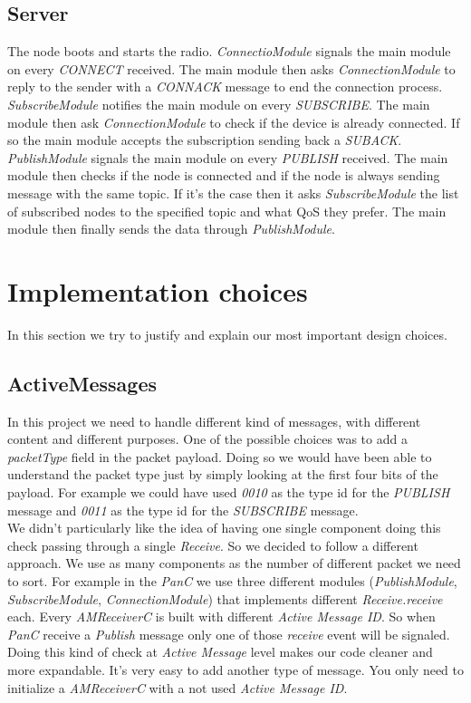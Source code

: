 \documentclass[10pt]{article}
\begin{document}
\subsection{Server}
The node boots and starts the radio. \emph{ConnectioModule} signals the main module on every \emph{CONNECT} received. The main module then asks \emph{ConnectionModule} to reply to the sender with a \emph{CONNACK} message to end the connection process. \emph{SubscribeModule} notifies the main module on every \emph{SUBSCRIBE}. The main module then ask \emph{ConnectionModule} to check if the device is already connected. If so the main module accepts the subscription sending back a \emph{SUBACK}. \emph{PublishModule} signals the main module on every \emph{PUBLISH} received. The main module then checks if the node is connected and if the node is always sending message with the same topic. If it's the case then it asks \emph{SubscribeModule} the list of subscribed nodes to the specified topic and what QoS they prefer. The main module then finally sends the data through \emph{PublishModule}.

\section{Implementation choices}
In this section we try to justify and explain our most important design choices.
\subsection{ActiveMessages}
In this project we need to handle different kind of messages, with different content and different purposes. One of the possible choices was to add a \emph{packetType} field in the packet payload. Doing so we would have been able to understand the packet type just by simply looking at the first four bits of the payload. For example we could have used \emph{0010} as the type id for the \emph{PUBLISH} message and \emph{0011} as the type id for the \emph{SUBSCRIBE} message.\\We didn't particularly like the idea of having one single component doing this check passing through a single \emph{Receive}. So we decided to follow a different approach. We use as many components as the number of different packet we need to sort. For example in the \emph{PanC} we use three different modules (\emph{PublishModule}, \emph{SubscribeModule}, \emph{ConnectionModule}) that implements different \emph{Receive.receive} each. Every \emph{AMReceiverC} is built with different \emph{Active Message ID}. So when \emph{PanC} receive a \emph{Publish} message only one of those \emph{receive} event will be signaled.\\Doing this kind of check at \emph{Active Message} level makes our code cleaner and more expandable. It's very easy to add another type of message. You only need to initialize a \emph{AMReceiverC} with a not used \emph{Active Message ID}.
\end{document}
